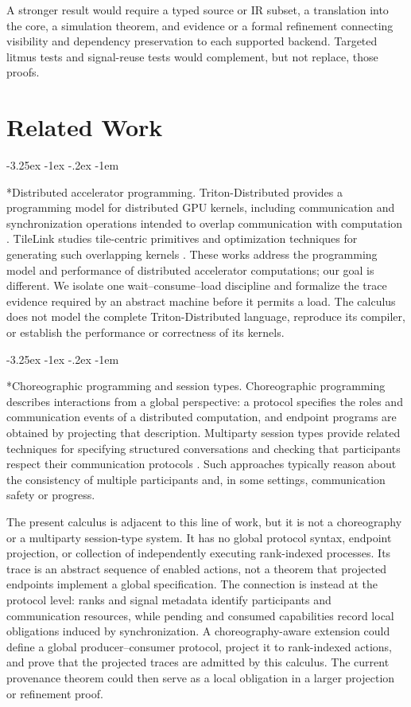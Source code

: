 \documentclass[a4paper,USenglish]{lipics-v2021}
\makeatletter
\renewcommand\paragraph{\@startsection{paragraph}{4}{\z@}%
  {-3.25ex \@plus -1ex \@minus -.2ex}%
  {-1em}%
  {\sffamily\large\bfseries\raggedright}}
\makeatother
\begin{document}
A stronger result would require a typed source or IR subset, a translation into the core, a simulation theorem, and evidence or a formal refinement connecting visibility and dependency preservation to each supported backend. Targeted litmus tests and signal-reuse tests would complement, but not replace, those proofs.

\section{Related Work}
\paragraph*{Distributed accelerator programming.} Triton-Distributed provides a programming model for distributed GPU kernels,
including communication and synchronization operations intended to overlap
communication with computation \cite{zheng2025tritondistributed}. TileLink
studies tile-centric primitives and optimization techniques for generating
such overlapping kernels \cite{zheng2025tilelink}. These works address the
programming model and performance of distributed accelerator computations;
our goal is different. We isolate one wait--consume--load discipline and
formalize the trace evidence required by an abstract machine before it
permits a load. The calculus does not model the complete Triton-Distributed
language, reproduce its compiler, or establish the performance or correctness
of its kernels.

\paragraph*{Choreographic programming and session types.} Choreographic programming describes interactions from a global perspective:
a protocol specifies the roles and communication events of a distributed
computation, and endpoint programs are obtained by projecting that
description. Multiparty session types provide related techniques for
specifying structured conversations and checking that participants respect
their communication protocols \cite{honda2016multiparty}. Such approaches
typically reason about the consistency of multiple participants and, in
some settings, communication safety or progress.

The present calculus is adjacent to this line of work, but it is not a
choreography or a multiparty session-type system. It has no global protocol
syntax, endpoint projection, or collection of independently executing
rank-indexed processes. Its trace is an abstract sequence of enabled actions,
not a theorem that projected endpoints implement a global specification.
The connection is instead at the protocol level: ranks and signal metadata
identify participants and communication resources, while pending and
consumed capabilities record local obligations induced by synchronization.
A choreography-aware extension could define a global producer--consumer
protocol, project it to rank-indexed actions, and prove that the projected
traces are admitted by this calculus. The current provenance theorem could
then serve as a local obligation in a larger projection or refinement proof.
\end{document}

